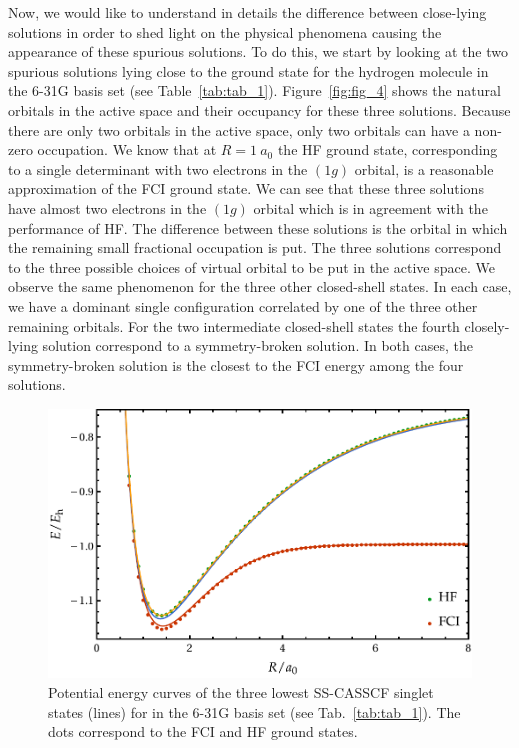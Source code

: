 \documentclass[aps,prb,reprint,showkeys,superscriptaddress]{revtex4-1}
\begin{document}
Now, we would like to understand in details the difference between close-lying solutions in order to shed light on the physical phenomena causing the appearance of these spurious solutions.
To do this, we start by looking at the two spurious solutions lying close to the ground state for the hydrogen molecule in the 6-31G basis set (see Table~\ref{tab:tab_1}).
Figure~\ref{fig:fig_4} shows the natural orbitals in the active space and their occupancy for these three solutions.
Because there are only two orbitals in the active space, only two orbitals can have a non-zero occupation.
We know that at $R=1~a_0$ the HF ground state, corresponding to a single determinant with two electrons in the $(1g)$ orbital, is a reasonable approximation of the FCI ground state.
We can see that these three solutions have almost two electrons in the $(1g)$ orbital which is in agreement with the performance of HF.
The difference between these solutions is the orbital in which the remaining small fractional occupation is put.
The three solutions correspond to the three possible choices of virtual orbital to be put in the active space.
We observe the same phenomenon for the three other closed-shell states.
In each case, we have a dominant single configuration correlated by one of the three other remaining orbitals.
For the two intermediate closed-shell states the fourth closely-lying solution correspond to a symmetry-broken solution.
In both cases, the symmetry-broken solution is the closest to the FCI energy among the four solutions.

\begin{figure}
  \centering
  \includegraphics[width=0.9\linewidth]{Figures/fig_5.pdf}
  \caption{Potential energy curves of the three lowest SS-CASSCF singlet states (lines) for  in the 6-31G basis set (see Tab.~\ref{tab:tab_1}). The dots correspond to the FCI and HF ground states. \label{fig:fig_5}}
\end{figure}
\end{document}
